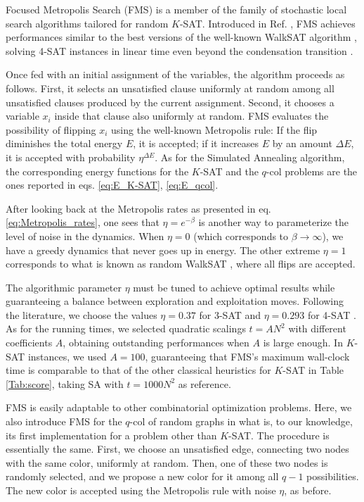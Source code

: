 \documentclass{article}
\begin{document}
Focused Metropolis Search (FMS) is a member of the family of stochastic local search algorithms tailored for random $K$-SAT. Introduced in Ref. \cite{Seitz_2005}, FMS achieves performances similar to the best versions of the well-known WalkSAT algorithm \cite{AurellNIPS2004WalkSAT, Seitz_2005}, solving 4-SAT instances in linear time even beyond the condensation transition \cite{AlavaPNAS2008}.

Once fed with an initial assignment of the variables, the algorithm proceeds as follows. First, it selects an unsatisfied clause uniformly at random among all unsatisfied clauses produced by the current assignment. Second, it chooses a variable $x_i$ inside that clause also uniformly at random. FMS evaluates the possibility of flipping $x_i$ using the well-known Metropolis rule: If the flip diminishes the total energy $E$, it is accepted; if it increases $E$ by an amount $\Delta E$, it is accepted with probability $\eta^{\Delta E}$. 
As for the Simulated Annealing algorithm, the corresponding energy functions for the $K$-SAT and the $q$-col problems are the ones reported in eqs. \eqref{eq:E_K-SAT}, \eqref{eq:E_qcol}.

After looking back at the Metropolis rates as presented in eq. \eqref{eq:Metropolis_rates}, one sees that $\eta=e^{-\beta}$ is another way to parameterize the level of noise in the dynamics. When $\eta=0$ (which corresponds to $\beta \to \infty$), we have a greedy dynamics that never goes up in energy. The other extreme $\eta=1$ corresponds to what is known as random WalkSAT \cite{PapadimitrouWalkSAT}, where all flips are accepted. 

The algorithmic parameter $\eta$ must be tuned to achieve optimal results while guaranteeing a balance between exploration and exploitation moves. Following the literature, we choose the values $\eta=0.37$ for 3-SAT \cite{Seitz_2005} and $\eta=0.293$ for 4-SAT \cite{AlavaPNAS2008}. As for the running times, we selected quadratic scalings $t = A N^{2}$ with different coefficients $A$, obtaining outstanding performances when $A$ is large enough. In $K$-SAT instances, we used $A=100$, guaranteeing that FMS's maximum wall-clock time is comparable to that of the other classical heuristics for $K$-SAT in Table \ref{Tab:score}, taking SA with $t=1000N^{2}$ as reference.   


FMS is easily adaptable to other combinatorial optimization problems. Here, we also introduce FMS for the $q$-col of random graphs in what is, to our knowledge, its first implementation for a problem other than $K$-SAT. The procedure is essentially the same. First, we choose an unsatisfied edge, connecting two nodes with the same color, uniformly at random. Then, one of these two nodes is randomly selected, and we propose a new color for it among all $q-1$ possibilities. The new color is accepted using the Metropolis rule with noise $\eta$, as before.
\end{document}

